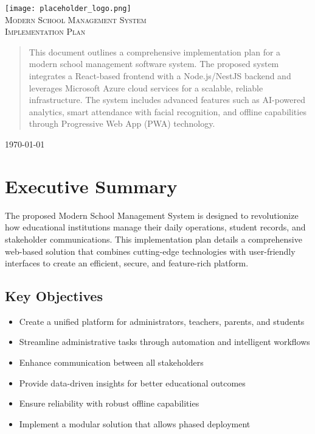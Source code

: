 \documentclass[11pt]{report}
\begin{document}
\begin{titlepage}
    \centering
    \vspace*{1cm}
    \texttt{[image: placeholder\_logo.png]}\\[1cm]
    
    \textsc{\LARGE Modern School Management System}\\[0.5cm]
    \textsc{\Large Implementation Plan}\\[1cm]
    
    \begin{abstract}
    This document outlines a comprehensive implementation plan for a modern school management software system. The proposed system integrates a React-based frontend with a Node.js/NestJS backend and leverages Microsoft Azure cloud services for a scalable, reliable infrastructure. The system includes advanced features such as AI-powered analytics, smart attendance with facial recognition, and offline capabilities through Progressive Web App (PWA) technology.
    \end{abstract}
    
    \vfill
    
    {\large \today}
\end{titlepage}

\tableofcontents
\newpage

\chapter{Executive Summary}

The proposed Modern School Management System is designed to revolutionize how educational institutions manage their daily operations, student records, and stakeholder communications. This implementation plan details a comprehensive web-based solution that combines cutting-edge technologies with user-friendly interfaces to create an efficient, secure, and feature-rich platform.

\section{Key Objectives}
\begin{itemize}
    \item Create a unified platform for administrators, teachers, parents, and students
    \item Streamline administrative tasks through automation and intelligent workflows
    \item Enhance communication between all stakeholders
    \item Provide data-driven insights for better educational outcomes
    \item Ensure reliability with robust offline capabilities
    \item Implement a modular solution that allows phased deployment
\end{itemize}
\end{document}
